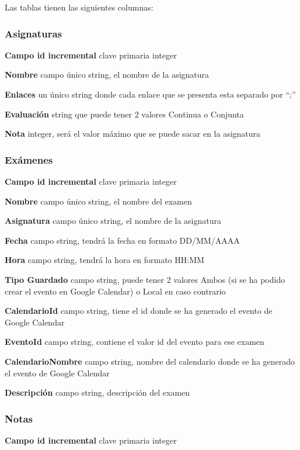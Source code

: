 Las tablas tienen las siguientes columnas:
\subsubsection{Asignaturas}
\label{subsubsecc:Asignaturas}

\textbf{Campo id incremental} clave primaria integer

\textbf{Nombre} campo único string, el nombre de la asignatura

\textbf{Enlaces}   un único string donde cada enlace que se presenta esta separado por “;”

\textbf{Evaluación} string que puede tener 2 valores Continua o Conjunta

\textbf{Nota} integer, será el valor máximo que se puede sacar en la asignatura

\subsubsection{Exámenes}
\label{subsubsecc:Exámenes}


\textbf{Campo id incremental} clave primaria integer

\textbf{Nombre} campo único string, el nombre del examen

\textbf{Asignatura} campo único string, el nombre de la asignatura

\textbf{Fecha} campo string, tendrá la fecha en formato DD/MM/AAAA

\textbf{Hora} campo string, tendrá la hora en formato HH:MM

\textbf{Tipo Guardado} campo string, puede tener 2 valores Ambos (si se ha podido crear el evento en Google Calendar) o Local  en caso contrario

\textbf{CalendarioId} campo string, tiene el id donde se ha generado el evento de Google Calendar

\textbf{EventoId} campo string, contiene el valor id del evento para ese examen

\textbf{CalendarioNombre} campo string, nombre del calendario donde se ha generado el evento de Google Calendar

\textbf{Descripción} campo string, descripción del examen

\subsubsection{Notas}
\label{subsubsecc:Notas}


\textbf{Campo id incremental} clave primaria integer

